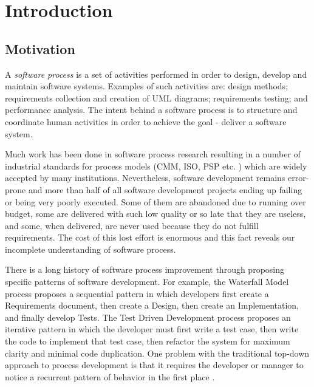 \chapter{Introduction}
\section{Motivation}
A \textit{software process} is a set of activities performed in order to design, develop and maintain software systems. Examples of such activities are: design methods; requirements collection and creation of UML diagrams; requirements testing; and performance analysis. The intent behind a software process is to structure and coordinate human activities in order to achieve the goal - deliver a software system.

Much work has been done in software process research resulting in a number of industrial standards for process models (CMM, ISO, PSP etc. \cite{citeulike:5043104}) which are widely accepted by many institutions. Nevertheless, software development remains error-prone and more than half of all software development projects ending up failing or being very poorly executed. Some of them are abandoned due to running over budget, some are delivered with such low quality or so late that they are useless, and some, when delivered, are never used because they do not fulfill requirements. The cost of this lost effort is enormous and this fact reveals our incomplete understanding of software process.

There is a long history of software process improvement through proposing specific patterns of software development. For example, the Waterfall Model process proposes a sequential pattern in which developers first create a Requirements document, then create a Design, then create an Implementation, and finally develop Tests. The Test Driven Development process proposes an iterative pattern in which the developer must first write a test case, then write the code to implement that test case, then refactor the system for maximum clarity and minimal code duplication. One problem with the traditional top-down approach to process development is that it requires the developer or manager to notice a recurrent pattern of behavior in the first place \cite{citeulike:5043104}. 

